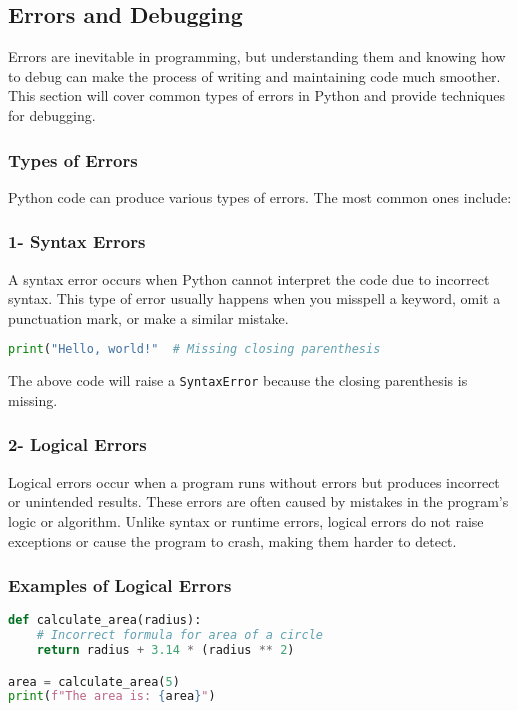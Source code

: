 \subsection{Errors and Debugging}

Errors are inevitable in programming, but understanding them and knowing how to debug can make the process of writing and maintaining code much smoother. This section will cover common types of errors in Python and provide techniques for debugging.

\subsubsection{Types of Errors}

Python code can produce various types of errors. The most common ones include:

\subsubsection{1- Syntax Errors}

A syntax error occurs when Python cannot interpret the code due to incorrect syntax. This type of error usually happens when you misspell a keyword, omit a punctuation mark, or make a similar mistake.

\begin{lstlisting}[language=Python, caption=Syntax Error Example]
print("Hello, world!"  # Missing closing parenthesis
\end{lstlisting}

The above code will raise a \texttt{SyntaxError} because the closing parenthesis is missing.

\subsubsection{2- Logical Errors}

Logical errors occur when a program runs without errors but produces incorrect or unintended results. These errors are often caused by mistakes in the program’s logic or algorithm. Unlike syntax or runtime errors, logical errors do not raise exceptions or cause the program to crash, making them harder to detect.

\subsubsection{Examples of Logical Errors}

\begin{lstlisting}[language=Python, caption=Logical Error Example]
def calculate_area(radius):
    # Incorrect formula for area of a circle
    return radius + 3.14 * (radius ** 2)

area = calculate_area(5)
print(f"The area is: {area}")
\end{lstlisting}


